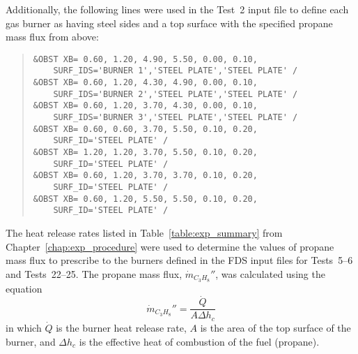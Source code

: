 Additionally, the following lines were used in the Test~2 input file to define each gas burner as having steel sides and a top surface with the specified propane mass flux from above:
\begin{quote}
\begin{verbatim}
&OBST XB= 0.60, 1.20, 4.90, 5.50, 0.00, 0.10, 
    SURF_IDS='BURNER 1','STEEL PLATE','STEEL PLATE' /
&OBST XB= 0.60, 1.20, 4.30, 4.90, 0.00, 0.10, 
    SURF_IDS='BURNER 2','STEEL PLATE','STEEL PLATE' /
&OBST XB= 0.60, 1.20, 3.70, 4.30, 0.00, 0.10, 
    SURF_IDS='BURNER 3','STEEL PLATE','STEEL PLATE' /
&OBST XB= 0.60, 0.60, 3.70, 5.50, 0.10, 0.20, 
    SURF_ID='STEEL PLATE' /
&OBST XB= 1.20, 1.20, 3.70, 5.50, 0.10, 0.20, 
    SURF_ID='STEEL PLATE' /
&OBST XB= 0.60, 1.20, 3.70, 3.70, 0.10, 0.20, 
    SURF_ID='STEEL PLATE' /
&OBST XB= 0.60, 1.20, 5.50, 5.50, 0.10, 0.20, 
    SURF_ID='STEEL PLATE' /
\end{verbatim}
\end{quote}

The heat release rates listed in Table~\ref{table:exp_summary} from Chapter~\ref{chap:exp_procedure} were used to determine the values of propane mass flux to prescribe to the burners defined in the FDS input files for Tests~5--6 and Tests~22--25. The propane mass flux, $\dot{m}_{C_3H_8}''$, was calculated using the equation
\begin{equation}
  \dot{m}_{C_3H_8}''=\frac{\dot{Q}}{A\Delta h_c}
\end{equation}
in which $\dot{Q}$ is the burner heat release rate, $A$ is the area of the top surface of the burner, and $\Delta h_c$ is the effective heat of combustion of the fuel (propane).

